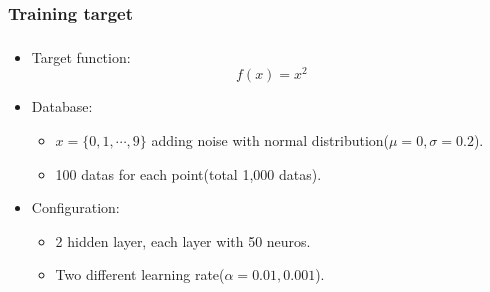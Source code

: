 \documentclass{beamer}
\begin{document}
    \subsubsection*{Training target}
    \begin{frame}
        \frametitle{\subsubsecname}

        \begin{itemize}
            \item Target function:
                $$f(x)=x^2$$
            \item Database:
                \begin{itemize}
                    \item $x=\{0,1,\cdots,9\}$ adding noise with normal distribution($\mu=0, \sigma=0.2$).
                    \item 100 datas for each point(total 1,000 datas).
                \end{itemize}
            \item Configuration:
                \begin{itemize}
                    \item 2 hidden layer, each layer with 50 neuros.
                    \item Two different learning rate($\alpha=0.01, 0.001$).
                \end{itemize}

        \end{itemize}

    \end{frame}
\end{document}
